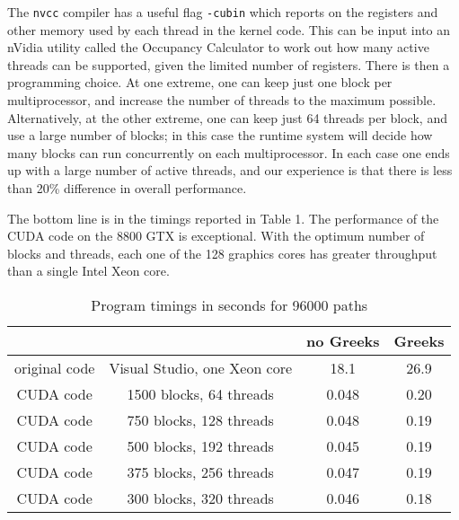 \documentclass[12pt]{article}
\begin{document}
The {\tt nvcc} compiler has a useful flag {\tt -cubin} which reports on the 
registers and other memory used by each thread in the kernel code.  This can 
be input into an nVidia utility called the Occupancy Calculator to work out
how many active threads can be supported, given the limited number of registers.
There is then a programming choice.  At one extreme, one can keep just one block
per multiprocessor, and increase the number of threads to the maximum possible.
Alternatively, at the other extreme, one can 
keep just 64 threads per block, and use a large number of blocks; in this case
the runtime system will decide how many blocks can run concurrently on each 
multiprocessor.  In each case one ends up with a large number of active threads,
and our experience is that there is less than 20\% difference in overall 
performance.

The bottom line is in the timings reported in Table 1.  The performance 
of the CUDA code on the 8800 GTX is exceptional.  With the optimum 
number of blocks and threads, each one of the 128 graphics cores has 
greater throughput than a single Intel Xeon core.  



\begin{table}[h]
\begin{center}
\begin{tabular}{|c|c|c|c|}\hline
              &                              & no Greeks & Greeks \\ \hline
original code & Visual Studio, one Xeon core & 18.1  & 26.9 \\
CUDA code     & 1500 blocks,  64 threads     &  0.048 & 0.20  \\ 
CUDA code     &  750 blocks, 128 threads     &  0.048 & 0.19 \\ 
CUDA code     &  500 blocks, 192 threads     &  0.045 & 0.19 \\ 
CUDA code     &  375 blocks, 256 threads     &  0.047 & 0.19 \\ 
CUDA code     &  300 blocks, 320 threads     &  0.046 & 0.18 \\ \hline
\end{tabular}
\end{center}
\caption{Program timings in seconds for 96000 paths}
\end{table}
\end{document}
